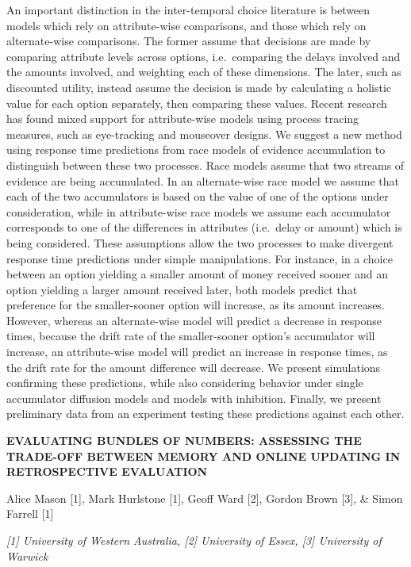 \documentclass[]{article}
\begin{document}
An important distinction in the inter-temporal choice literature is
between models which rely on attribute-wise comparisons, and those which
rely on alternate-wise comparisons. The former assume that decisions are
made by comparing attribute levels across options, i.e.~comparing the
delays involved and the amounts involved, and weighting each of these
dimensions. The later, such as discounted utility, instead assume the
decision is made by calculating a holistic value for each option
separately, then comparing these values. Recent research has found mixed
support for attribute-wise models using process tracing measures, such
as eye-tracking and mouseover designs. We suggest a new method using
response time predictions from race models of evidence accumulation to
distinguish between these two processes. Race models assume that two
streams of evidence are being accumulated. In an alternate-wise race
model we assume that each of the two accumulators is based on the value
of one of the options under consideration, while in attribute-wise race
models we assume each accumulator corresponds to one of the differences
in attributes (i.e.~delay or amount) which is being considered. These
assumptions allow the two processes to make divergent response time
predictions under simple manipulations. For instance, in a choice
between an option yielding a smaller amount of money received sooner and
an option yielding a larger amount received later, both models predict
that preference for the smaller-sooner option will increase, as its
amount increases. However, whereas an alternate-wise model will predict
a decrease in response times, because the drift rate of the
smaller-sooner option's accumulator will increase, an attribute-wise
model will predict an increase in response times, as the drift rate for
the amount difference will decrease. We present simulations confirming
these predictions, while also considering behavior under single
accumulator diffusion models and models with inhibition. Finally, we
present preliminary data from an experiment testing these predictions
against each other.

\textbf{EVALUATING BUNDLES OF NUMBERS: ASSESSING THE TRADE-OFF BETWEEN
MEMORY AND ONLINE UPDATING IN RETROSPECTIVE EVALUATION}

Alice Mason {[}1{]}, Mark Hurlstone {[}1{]}, Geoff Ward {[}2{]}, Gordon
Brown {[}3{]}, \& Simon Farrell {[}1{]}

\emph{{[}1{]} University of Western Australia, {[}2{]} University of
Essex, {[}3{]} University of Warwick}
\end{document}
